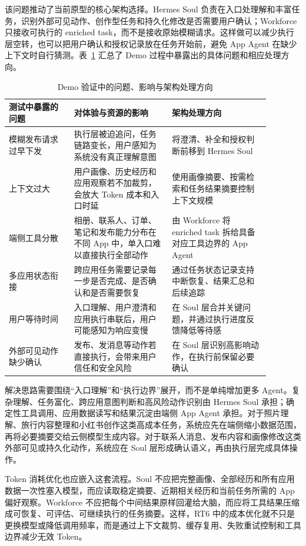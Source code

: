 该问题推动了当前原型的核心架构选择。Hermes Soul 负责在入口处理解和丰富任务，识别外部可见动作、创作型任务和持久化修改是否需要用户确认；Workforce 只接收可执行的 enriched task，而不是接收原始模糊请求。这样做可以减少执行层空转，也可以把用户确认和授权记录放在任务开始前，避免 App Agent 在缺少上下文时自行猜测。表~\ref{tab:rt4-demo-painpoints} 汇总了 Demo 过程中暴露出的具体问题和相应处理方向。

\begin{table}[h]
\centering
\begin{tabular}{p{0.22\linewidth}p{0.33\linewidth}p{0.33\linewidth}}
\hline
\textbf{测试中暴露的问题} & \textbf{对体验与资源的影响} & \textbf{架构处理方向} \\
\hline
模糊发布请求过早下发 & 执行层被迫追问，任务链路变长，用户感知为系统没有真正理解意图 & 将澄清、补全和授权判断前移到 Hermes Soul \\
上下文过大 & 用户画像、历史经历和应用观察若不加裁剪，会放大 Token 成本和入口时延 & 使用画像摘要、按需检索和任务结果摘要控制上下文规模 \\
端侧工具分散 & 相册、联系人、订单、笔记和发布能力分布在不同 App 中，单入口难以直接执行全部动作 & 由 Workforce 将 enriched task 拆给具备对应工具边界的 App Agent \\
多应用状态衔接 & 跨应用任务需要记录每一步是否完成、是否确认和是否需要恢复 & 通过任务状态记录支持中断恢复、结果汇总和后续追踪 \\
用户等待时间 & 入口理解、用户澄清和应用执行串联后，用户可能感知为响应变慢 & 在 Soul 层合并关键问题，并通过执行进度反馈降低等待感 \\
外部可见动作缺少确认 & 发布、发消息等动作若直接执行，会带来用户信任和安全风险 & 在 Soul 层识别高影响动作，在执行前保留必要确认 \\
\hline
\end{tabular}
\caption{Demo 验证中的问题、影响与架构处理方向}
\label{tab:rt4-demo-painpoints}
\end{table}

解决思路需要围绕“入口理解”和“执行边界”展开，而不是单纯增加更多 Agent。复杂理解、任务富化、跨应用意图判断和高风险动作识别由 Hermes Soul 承担；确定性工具调用、应用数据读写和结果沉淀由端侧 App Agent 承担。对于照片理解、旅行内容整理和小红书创作这类高成本任务，系统应先在端侧缩小数据范围，再将必要摘要交给云侧模型生成内容。对于联系人消息、发布内容和画像修改这类外部可见或持久化动作，系统应在 Soul 层形成确认语义，再由执行层完成具体操作。

Token 消耗优化也应嵌入这套流程。Soul 不应把完整画像、全部经历和所有应用数据一次性塞入模型，而应读取稳定摘要、近期相关经历和当前任务所需的 App 偏好观察。Workforce 不应把每个中间结果原样回灌给大脑，而应将工具结果压缩成可恢复、可评估、可继续执行的任务摘要。这样，RT6 中的成本优化就不只是更换模型或降低调用频率，而是通过上下文裁剪、缓存复用、失败重试控制和工具边界减少无效 Token。


